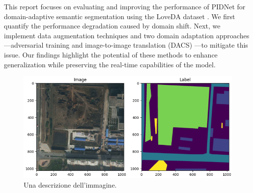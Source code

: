 \documentclass{article}
\begin{document}
\begin{multicols}{2}
		This report focuses on evaluating and improving the performance of PIDNet for domain-adaptive semantic segmentation using the LoveDA dataset \cite{loveda2021}. We first quantify the performance degradation caused by domain shift. Next, we implement data augmentation techniques and two domain adaptation approaches—adversarial training and image-to-image translation (DACS)\cite{tranheden2021dacs} —to mitigate this issue. Our findings highlight the potential of these methods to enhance generalization while preserving the real-time capabilities of the model.
		
		
		\begin{figure}[H]
			\centering
			\includegraphics[width=0.8\linewidth]{image/urban_1.png}
			\caption{Una descrizione dell'immagine.}
			\label{fig:urban_image}
		  \end{figure}






\end{multicols}
\end{document}
